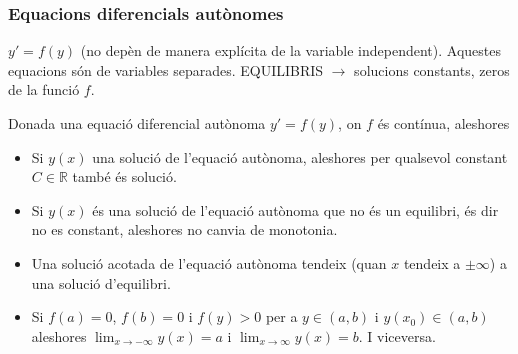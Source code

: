 \documentclass[../main.tex]{subfiles}
\begin{document}
\subsubsection{Equacions diferencials autònomes}
$y' = f(y)$ (no depèn de manera explícita de la variable independent). Aquestes equacions són de
variables separades. EQUILIBRIS $\rightarrow$ solucions constants, zeros de la funció $f$.
\begin{teorema}
    Donada una equació diferencial autònoma $y' = f(y)$, on $f$ és contínua, aleshores
    \begin{itemize}
        \item Si $y(x)$ una solució de l'equació autònoma, aleshores per qualsevol constant $C \in \mathbb{R}$
        també és solució.
        \item Si $y(x)$ és una solució de l'equació autònoma que no és un equilibri, és dir no es
        constant, aleshores no canvia de monotonia.
        \item Una solució acotada de l'equació autònoma tendeix (quan $x$ tendeix a $\pm \infty$) a
        una solució d'equilibri.
        \item Si $f(a) = 0$, $f(b) = 0$ i $f(y) > 0$ per a $y \in (a, b)$ i $y(x_0) \in (a, b)$
        aleshores $\lim_{x \to -\infty} y(x) = a$ i $\lim_{x \to \infty} y(x) = b$. I viceversa.
    \end{itemize}
\end{teorema}
\end{document}
